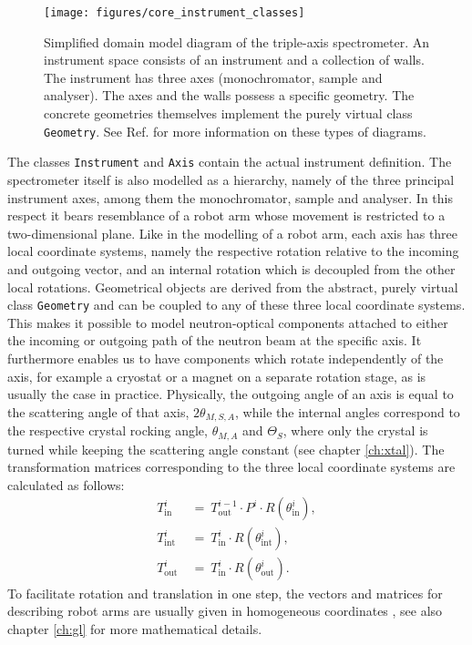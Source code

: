 \begin{figure}
	\begin{center}
		\texttt{[image: figures/core\_instrument\_classes]}
	\end{center}
	\caption[Instrument class hierarchy.]{Simplified domain model diagram of the triple-axis
		spectrometer. An instrument space consists of an instrument and a collection
		of walls. The instrument has three axes (monochromator, sample and analyser). The axes
		and the walls possess a specific geometry. The concrete geometries themselves implement
		the purely virtual class \lstinline[language=C++]|Geometry|.
		See Ref. \cite{web_domainmodeldiagram} for more information on these types of diagrams.
	\label{fig:tas_class_hierarchy}}
\end{figure}

The classes \lstinline[language=C++]|Instrument| and \lstinline[language=C++]|Axis| contain the actual
instrument definition. The spectrometer itself is also modelled as a hierarchy, namely of the
three principal instrument axes, among them the monochromator, sample and analyser.
In this respect it bears resemblance of a robot arm whose movement is restricted to a
two-dimensional plane.
Like in the modelling of a robot arm, each axis has three local coordinate systems, namely the
respective rotation relative to the incoming and outgoing vector, and an internal rotation which is
decoupled from the other local rotations.
Geometrical objects are derived from the abstract, purely virtual class \lstinline[language=C++]|Geometry|
and can be coupled to any of these three local coordinate systems.
This makes it possible to model neutron-optical components attached to either the incoming or
outgoing path of the neutron beam at the specific axis.
It furthermore enables us to have components which rotate independently of the axis,
for example a cryostat or a magnet on a separate rotation stage, as is usually the case in practice.
Physically, the outgoing angle of an axis is equal to the scattering angle of that axis, $2\theta_{M,S,A}$,
while the internal angles correspond to the respective crystal rocking angle, $\theta_{M,A}$ and $\Theta_{S}$,
where only the crystal is turned while keeping the scattering angle constant \cite[p. 87]{Shirane2002}
(see chapter \ref{ch:xtal}).
The transformation matrices corresponding to the three local coordinate systems are calculated as follows:
\begin{equation}
\begin{split}
	T_{\mathrm{in}}^{i} & \ =\  T_{\mathrm{out}}^{i-1} \cdot P^{i} \cdot R\left(\theta_{\mathrm{in}}^{i}\right), \\
	T_{\mathrm{int}}^{i} & \ =\  T_{\mathrm{in}}^{i} \cdot R\left(\theta_{\mathrm{int}}^{i}\right), \\
	T_{\mathrm{out}}^{i} & \ =\  T_{\mathrm{in}}^{i} \cdot R\left(\theta_{\mathrm{out}}^{i}\right).
\end{split}
\end{equation}
To facilitate rotation and translation in one step, the vectors and matrices for describing robot arms
are usually given in homogeneous coordinates \cite{Choset2010_ch3}, see also chapter \ref{ch:gl} for 
more mathematical details.

